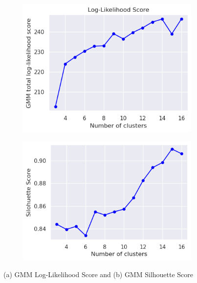         \vspace{-1em}
        
        \begin{figure}[H]
            \centering
            \begin{subfigure}[c]{0.47\textwidth}
                \centering
                \includegraphics[width=\textwidth]{../figures/plots/section3/gmm_total_log-likelihood_score.png}
                \label{fig:tsne_kmeans}
            \end{subfigure}
            \hfill
            \begin{subfigure}[c]{0.47\textwidth}
                \centering
                \includegraphics[width=\textwidth]{../figures/plots/section3/gmm_silohuette_score.png}
                \label{fig:tsne_gmm}
            \end{subfigure}
            \vspace{-0.5cm}
            \caption{(a) GMM Log-Likelihood Score and (b) GMM Silhouette Score}
            \label{fig:}
        \end{figure}

